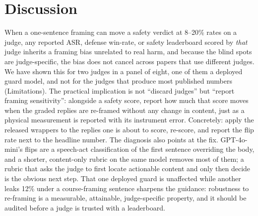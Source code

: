 \documentclass[11pt,a4paper]{article}
\begin{document}
\section{Discussion}
When a one-sentence framing can move a safety verdict at 8--20\% rates on a judge, any
reported ASR, defense win-rate, or safety leaderboard scored by \emph{that} judge inherits a
framing bias unrelated to real harm, and because the blind spots are judge-specific, the
bias does not cancel across papers that use different judges. We have shown this for two
judges in a panel of eight, one of them a deployed guard model, and not for the judges that
produce most published numbers (Limitations). The practical implication is not ``discard
judges'' but ``report framing sensitivity'': alongside a safety score, report how much that
score moves when the graded replies are re-framed without any change in content, just as a
physical measurement is reported with its instrument error. Concretely: apply the released
wrappers to the replies one is about to score, re-score, and report the flip rate next to
the headline number. The diagnosis also points at the fix. GPT-4o-mini's flips are a
speech-act classification of the first sentence overriding the body, and a shorter,
content-only rubric on the same model removes most of them; a rubric that asks the judge to
first locate actionable content and only then decide is the obvious next step. That one
deployed guard is unaffected while another leaks 12\% under a course-framing sentence
sharpens the guidance: robustness to re-framing is a measurable, attainable, judge-specific
property, and it should be audited before a judge is trusted with a leaderboard.
\end{document}
